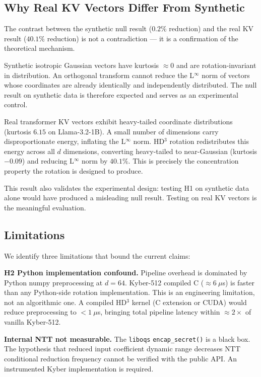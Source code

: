 \documentclass[preprint,a4paper]{article}
\begin{document}
\subsection{Why Real KV Vectors Differ From Synthetic}
\label{sec:synthetic_vs_real}

The contrast between the synthetic null result ($0.2\%$
reduction) and the real KV result ($40.1\%$ reduction)
is not a contradiction --- it is a confirmation of the
theoretical mechanism.

Synthetic isotropic Gaussian vectors have kurtosis
$\approx 0$ and are rotation-invariant in distribution.
An orthogonal transform cannot reduce the L$^\infty$
norm of vectors whose coordinates are already
identically and independently distributed.
The null result on synthetic data is therefore
expected and serves as an experimental control.

Real transformer KV vectors exhibit heavy-tailed
coordinate distributions (kurtosis $6.15$ on
Llama-3.2-1B). A small number of dimensions carry
disproportionate energy, inflating the L$^\infty$
norm. HD$^3$ rotation redistributes this energy
across all $d$ dimensions, converting heavy-tailed
to near-Gaussian (kurtosis $-0.09$) and reducing
L$^\infty$ norm by $40.1\%$. This is precisely
the concentration property the rotation is
designed to produce.

This result also validates the experimental design:
testing H1 on synthetic data alone would have
produced a misleading null result. Testing on real
KV vectors is the meaningful evaluation.

\subsection{Limitations}
\label{sec:limitations}

We identify three limitations that bound the
current claims:

\textbf{H2 Python implementation confound.}
Pipeline overhead is dominated by Python numpy
preprocessing at $d = 64$. Kyber-512 compiled C
($\approx 6~\mu$s) is faster than any Python-side
rotation implementation. This is an engineering
limitation, not an algorithmic one. A compiled
HD$^3$ kernel (C extension or CUDA) would reduce
preprocessing to $< 1~\mu$s, bringing total
pipeline latency within $\approx 2\times$ of
vanilla Kyber-512.

\textbf{Internal NTT not measurable.}
The \texttt{liboqs} \texttt{encap\_secret()} is a
black box. The hypothesis that reduced input
coefficient dynamic range decreases NTT conditional
reduction frequency cannot be verified with the
public API. An instrumented Kyber implementation
is required.
\end{document}
